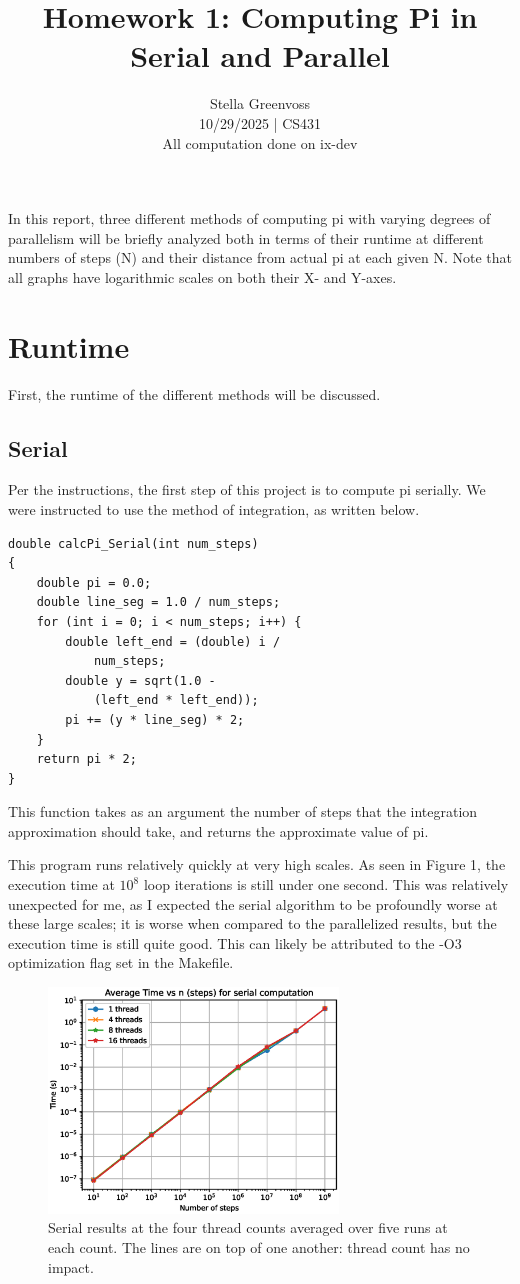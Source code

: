 \documentclass[a4paper]{article}
\title{Homework 1: Computing Pi in Serial and Parallel}
\author{
Stella Greenvoss \\ 
10/29/2025 | CS431\\
All computation done on ix-dev
}
\begin{document}
\maketitle

In this report, three different methods of computing pi with varying degrees of parallelism will be briefly analyzed both in terms of their runtime at different numbers of steps (N) and their distance from actual pi at each given N. Note that all graphs have logarithmic scales on both their X- and Y-axes.
\section{Runtime}
First, the runtime of the different methods will be discussed.
\subsection{Serial}
Per the instructions, the first step of this project is to compute pi serially. We were instructed to use the method of integration, as written below.
\begin{verbatim}
double calcPi_Serial(int num_steps)
{
    double pi = 0.0;
    double line_seg = 1.0 / num_steps;
    for (int i = 0; i < num_steps; i++) {
        double left_end = (double) i / 
            num_steps;
        double y = sqrt(1.0 - 
            (left_end * left_end));
        pi += (y * line_seg) * 2;	
    }
    return pi * 2;
}
\end{verbatim}
This function takes as an argument the number of steps that the integration approximation should take, and returns the approximate value of pi.

This program runs relatively quickly at very high scales. As seen in Figure 1, the execution time at $10^8$ loop iterations is still under one second. This was relatively unexpected for me, as I expected the serial algorithm to be profoundly worse at these large scales; it is worse when compared to the parallelized results, but the execution time is still quite good. This can likely be attributed to the -O3 optimization flag set in the Makefile. 

\begin{figure}[ht]
\begin{center}
\includegraphics[height=6cm]{fig_serial.eps}
\caption{Serial results at the four thread counts averaged over five runs at each count. The lines are on top of one another: thread count has no impact.}
\label{fig1}
\end{center}
\end{figure}
\end{document}
